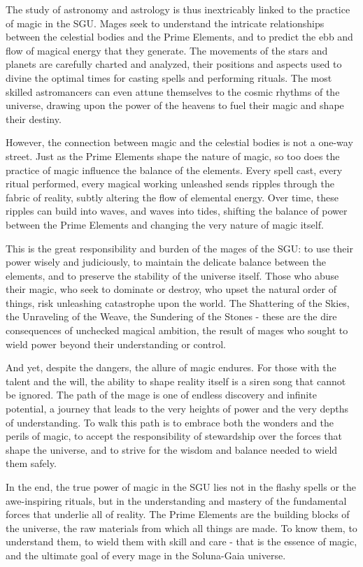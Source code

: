 \documentclass[12pt]{article}
\begin{document}
The study of astronomy and astrology is thus inextricably linked to the practice of magic in the SGU. Mages seek to understand the intricate relationships between the celestial bodies and the Prime Elements, and to predict the ebb and flow of magical energy that they generate. The movements of the stars and planets are carefully charted and analyzed, their positions and aspects used to divine the optimal times for casting spells and performing rituals. The most skilled astromancers can even attune themselves to the cosmic rhythms of the universe, drawing upon the power of the heavens to fuel their magic and shape their destiny.

However, the connection between magic and the celestial bodies is not a one-way street. Just as the Prime Elements shape the nature of magic, so too does the practice of magic influence the balance of the elements. Every spell cast, every ritual performed, every magical working unleashed sends ripples through the fabric of reality, subtly altering the flow of elemental energy. Over time, these ripples can build into waves, and waves into tides, shifting the balance of power between the Prime Elements and changing the very nature of magic itself.

This is the great responsibility and burden of the mages of the SGU: to use their power wisely and judiciously, to maintain the delicate balance between the elements, and to preserve the stability of the universe itself. Those who abuse their magic, who seek to dominate or destroy, who upset the natural order of things, risk unleashing catastrophe upon the world. The Shattering of the Skies, the Unraveling of the Weave, the Sundering of the Stones - these are the dire consequences of unchecked magical ambition, the result of mages who sought to wield power beyond their understanding or control.

And yet, despite the dangers, the allure of magic endures. For those with the talent and the will, the ability to shape reality itself is a siren song that cannot be ignored. The path of the mage is one of endless discovery and infinite potential, a journey that leads to the very heights of power and the very depths of understanding. To walk this path is to embrace both the wonders and the perils of magic, to accept the responsibility of stewardship over the forces that shape the universe, and to strive for the wisdom and balance needed to wield them safely.

In the end, the true power of magic in the SGU lies not in the flashy spells or the awe-inspiring rituals, but in the understanding and mastery of the fundamental forces that underlie all of reality. The Prime Elements are the building blocks of the universe, the raw materials from which all things are made. To know them, to understand them, to wield them with skill and care - that is the essence of magic, and the ultimate goal of every mage in the Soluna-Gaia universe.
\end{document}
